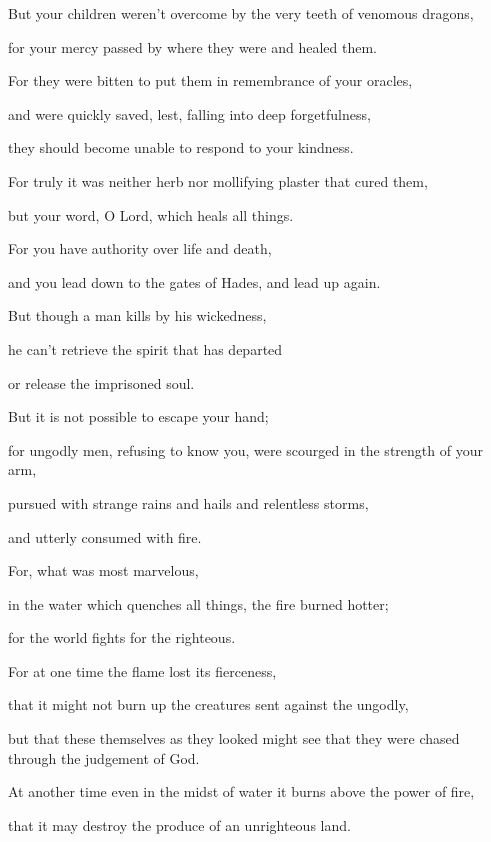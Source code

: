 {\par }{\Q {}But your children weren’t overcome by the very teeth of venomous dragons,
\par }{\QB for your mercy passed by where they were and healed them.
\par }{\Q {}For they were bitten to put them in remembrance of your oracles,
\par }{\QB and were quickly saved, lest, falling into deep forgetfulness,
\par }{\QB they should become unable to respond to your kindness.
\par }{\Q {}For truly it was neither herb nor mollifying plaster that cured them,
\par }{\QB but your word, O Lord, which heals all things.
\par }{\Q {}For you have authority over life and death,
\par }{\QB and you lead down to the gates of Hades, and lead up again.
\par }{\Q {}But though a man kills by his wickedness,
\par }{\QB he can’t retrieve the spirit that has departed
\par }{\QB or release the imprisoned soul.
\par }{\BB \par }{\Q {}But it is not possible to escape your hand;
\par }{\Q {}for ungodly men, refusing to know you, were scourged in the strength of your arm,
\par }{\QB pursued with strange rains and hails and relentless storms,
\par }{\QB and utterly consumed with fire.
\par }{\Q {}For, what was most marvelous,
\par }{\QB in the water which quenches all things, the fire burned hotter;
\par }{\QB for the world fights for the righteous.
\par }{\Q {}For at one time the flame lost its fierceness,
\par }{\QB that it might not burn up the creatures sent against the ungodly,
\par }{\QB but that these themselves as they looked might see that they were chased through the judgement of God.
\par }{\Q {}At another time even in the midst of water it burns above the power of fire,
\par }{\QB that it may destroy the produce of an unrighteous land.
}
